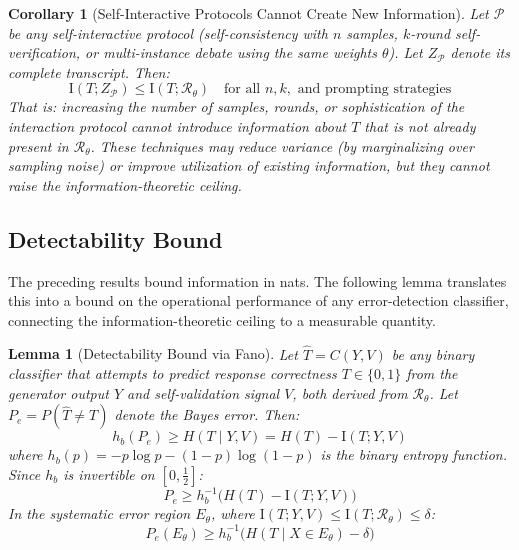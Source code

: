 \documentclass[11pt,a4paper]{article}
\newtheorem{corollary}{Corollary}[section]
\newtheorem{lemma}{Lemma}[section]
\theoremstyle{remark}
\newcommand{\MI}{\mathrm{I}}
\begin{document}
\begin{corollary}[Self-Interactive Protocols Cannot Create New Information]
\label{cor:no_new_info}
Let $\mathcal{P}$ be any self-interactive protocol (self-consistency with $n$ samples, $k$-round self-verification, or multi-instance debate using the same weights $\theta$). Let $Z_{\mathcal{P}}$ denote its complete transcript. Then:
\begin{equation}
  \MI(T; Z_{\mathcal{P}}) \leq \MI(T; \mathcal{R}_\theta) \quad \text{for all } n, k, \text{ and prompting strategies}
\end{equation}
That is: increasing the number of samples, rounds, or sophistication of the interaction protocol cannot introduce information about $T$ that is not already present in $\mathcal{R}_\theta$. These techniques may reduce variance (by marginalizing over sampling noise) or improve utilization of existing information, but they cannot raise the information-theoretic ceiling.
\end{corollary}

\subsection{Detectability Bound}

The preceding results bound information in nats. The following lemma translates this into a bound on the operational performance of any error-detection classifier, connecting the information-theoretic ceiling to a measurable quantity.

\begin{lemma}[Detectability Bound via Fano]
\label{lem:fano}
Let $\hat{T} = C(Y, V)$ be any binary classifier that attempts to predict response correctness $T \in \{0, 1\}$ from the generator output $Y$ and self-validation signal $V$, both derived from $\mathcal{R}_\theta$. Let $P_e = P(\hat{T} \neq T)$ denote the Bayes error. Then:
\begin{equation}
\label{eq:fano}
  h_b(P_e) \geq H(T \mid Y, V) = H(T) - \MI(T; Y, V)
\end{equation}
where $h_b(p) = -p \log p - (1-p)\log(1-p)$ is the binary entropy function. Since $h_b$ is invertible on $[0, \tfrac{1}{2}]$:
\begin{equation}
\label{eq:fano_explicit}
  P_e \geq h_b^{-1}\!\big(H(T) - \MI(T; Y, V)\big)
\end{equation}
In the systematic error region $E_\theta$, where $\MI(T; Y, V) \leq \MI(T; \mathcal{R}_\theta) \leq \delta$:
\begin{equation}
\label{eq:fano_region}
  P_e(E_\theta) \geq h_b^{-1}\!\big(H(T \mid X \in E_\theta) - \delta\big)
\end{equation}
\end{lemma}
\end{document}
